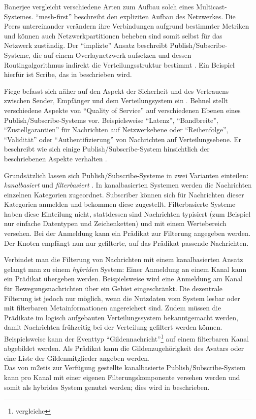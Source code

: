 Banerjee vergleicht verschiedene Arten zum Aufbau solch eines Multicast-Systemes. \enquote{mesh-first} beschreibt den expliziten Aufbau des Netzwerkes. Die Peers untereinander verändern ihre Verbindungen aufgrund bestimmter Metriken und können auch Netzwerkpartitionen beheben sind somit selbst für das Netzwerk zuständig. Der \enquote{implizte} Ansatz beschreibt Publish/Subscribe-Systeme, die auf einem Overlaynetzwerk aufsetzen und dessen Routingalgorithmus indirekt die Verteilungsstruktur bestimmt \cite{Banerjee2001Comparative}. Ein Beispiel hierfür ist Scribe, das in  beschrieben wird.

Fiege befasst sich näher auf den Aspekt der Sicherheit und des Vertrauens zwischen Sender, Empfänger und dem Verteilungsystem ein \cite{FiegeSecurity}. Behnel stellt verschiedene Aspekte von \enquote{Quality of Service} auf verschiedenen Ebenen eines Publish/Subscribe-Systems vor. Beispielsweise \enquote{Latenz}, \enquote{Bandbreite}, \enquote{Zustellgarantien} für Nachrichten auf Netzwerkebene oder \enquote{Reihenfolge}, \enquote{Validität} oder \enquote{Authentifizierung} von Nachrichten auf Verteilungsebene. Er beschreibt wie sich einige Publish/Subscribe-System hinsichtlich der beschriebenen Aspekte verhalten \cite{BeFiMu2006PubSubQoS}. 

Grundsätzlich lassen sich Publish/Subscribe-Systeme in zwei Varianten einteilen: \emph{kanalbasiert} und \emph{filterbasiert} \cite{Liu2003Survey}. In kanalbasierten Systemen werden die Nachrichten einzelnen Kategorien zugeordnet. Subscriber können sich für Nachrichten dieser Kategorien anmelden und bekommen diese zugestellt. Filterbasierte Systeme haben diese Einteilung nicht, stattdessen sind Nachrichten typisiert (zum Beispiel nur einfache Datentypen und Zeichenketten) und mit einem Wertebereich versehen. Bei der Anmeldung kann ein Prädikat zur Filterung angegeben werden. Der Knoten empfängt nun nur gefilterte, auf das Prädikat passende Nachrichten.

Verbindet man die Filterung von Nachrichten mit einem kanalbasierten Ansatz gelangt man zu einem \emph{hybriden} System: Einer Anmeldung an einem Kanal kann ein Prädikat übergeben werden. Beispielsweise wird eine Anmeldung am Kanal für Bewegungsnachrichten über ein Gebiet eingeschränkt. Die dezentrale Filterung ist jedoch nur möglich, wenn die Nutzdaten vom System lesbar oder mit filterbaren Metainformationen angereichert sind. Zudem müssen die Prädikate im logisch aufgebauten Verteilungssystem bekanntgemacht werden, damit Nachrichten frühzeitig bei der Verteilung gefiltert werden können. Beispielsweise kann der Eventtyp \enquote{Gildennachricht}\footnote{vergleiche } auf einem filterbaren Kanal abgebildet werden. Als Prädikat kann die Gildenzugehörigkeit des Avatars oder eine Liste der Gildenmitglieder angeben werden.\\
Das von \ac{m2etis} zur Verfügung gestellte kanalbasierte Publish/Subscribe-System kann pro Kanal mit einer eigenen Filterungskomponente versehen werden und somit als hybrides System genutzt werden; dies wird in  beschrieben.

